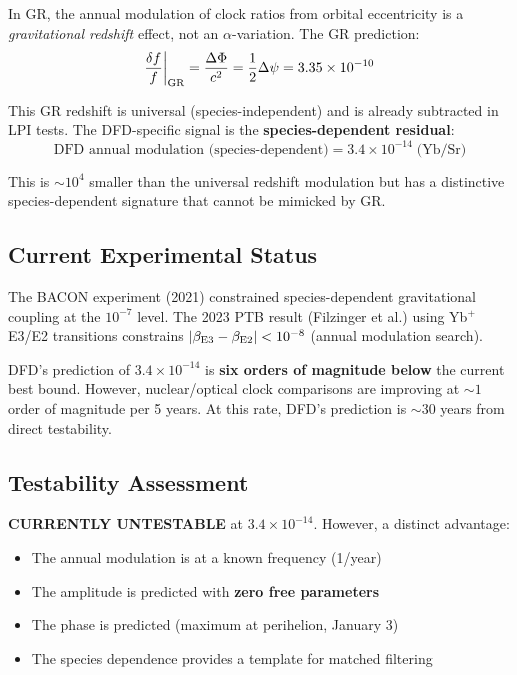 \documentclass[11pt]{article}
\begin{document}
In GR, the annual modulation of clock ratios from orbital eccentricity is a
\emph{gravitational redshift} effect, not an $\alpha$-variation. The GR prediction:
\begin{equation}
\frac{\delta f}{f}\bigg|_{\rm GR} = \frac{\Delta\Phi}{c^2} = \frac{1}{2}\Delta\psi = 3.35 \times 10^{-10}
\end{equation}

This GR redshift is universal (species-independent) and is already subtracted in LPI
tests. The DFD-specific signal is the \textbf{species-dependent residual}:
\begin{equation}
\boxed{\text{DFD annual modulation (species-dependent)} = 3.4 \times 10^{-14}\;\text{(Yb/Sr)}}
\end{equation}

This is $\sim 10^4$ smaller than the universal redshift modulation but has a distinctive
species-dependent signature that cannot be mimicked by GR.

\subsection{Current Experimental Status}

The BACON experiment (2021) constrained species-dependent gravitational coupling at the
$10^{-7}$ level. The 2023 PTB result (Filzinger et al.) using Yb$^+$ E3/E2 transitions
constrains $|\beta_{\rm E3} - \beta_{\rm E2}| < 10^{-8}$ (annual modulation search).

DFD's prediction of $3.4 \times 10^{-14}$ is \textbf{six orders of magnitude below}
the current best bound. However, nuclear/optical clock comparisons are improving at
$\sim 1$ order of magnitude per 5 years. At this rate, DFD's prediction is $\sim 30$
years from direct testability.

\subsection{Testability Assessment}

\textbf{CURRENTLY UNTESTABLE} at $3.4 \times 10^{-14}$. However, a distinct advantage:
\begin{itemize}
\item The annual modulation is at a known frequency (1/year)
\item The amplitude is predicted with \textbf{zero free parameters}
\item The phase is predicted (maximum at perihelion, January 3)
\item The species dependence provides a template for matched filtering
\end{itemize}
\end{document}
